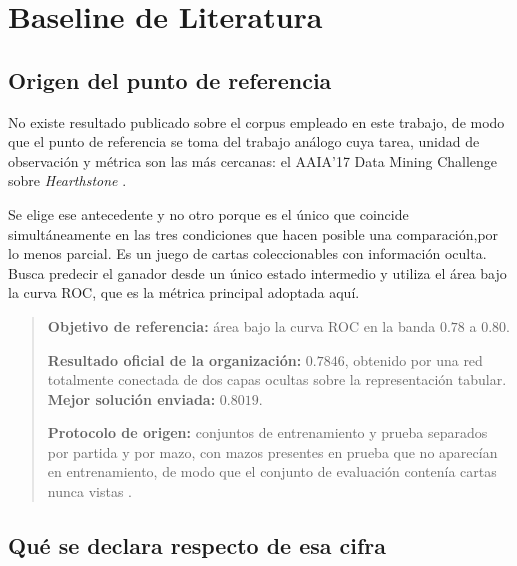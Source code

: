 %
\section{Baseline de Literatura}
\label{sec:baseline}

\subsection{Origen del punto de referencia}
\label{subsec:origenbaseline}

No existe resultado publicado sobre el corpus empleado en este trabajo, de
modo que el punto de referencia se toma del trabajo análogo cuya tarea,
unidad de observación y métrica son las más cercanas: el AAIA'17 Data Mining
Challenge sobre \emph{Hearthstone} \cite{janusz_hearthstone_2017}.

Se elige ese antecedente y no otro porque es el único que coincide
simultáneamente en las tres condiciones que hacen posible una comparación,por lo menos parcial. 
Es un juego de cartas coleccionables con información
oculta. Busca predecir el ganador desde un único estado intermedio y
utiliza el área bajo la curva ROC, que es la métrica principal
adoptada aquí.

\begin{quote}
\textbf{Objetivo de referencia:} área bajo la curva ROC en la banda
$0.78$ a $0.80$.

\textbf{Resultado oficial de la organización:} $0.7846$, obtenido por una
red totalmente conectada de dos capas ocultas sobre la representación
tabular. \textbf{Mejor solución enviada:} $0.8019$.

\textbf{Protocolo de origen:} conjuntos de entrenamiento y prueba separados
por partida y por mazo, con mazos presentes en prueba que no aparecían en
entrenamiento, de modo que el conjunto de evaluación contenía cartas nunca
vistas \cite{janusz_hearthstone_2017}.
\end{quote}

\subsection{Qué se declara respecto de esa cifra}
\label{subsec:objetivobaseline}

